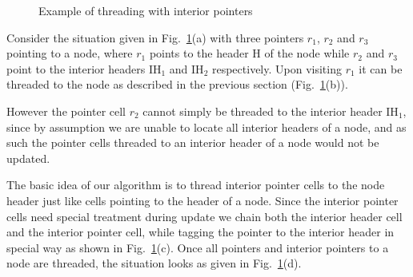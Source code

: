 \documentclass[10pt,a4paper,final,twocolumn]{article}
\begin{document}
\begin{figure}[htb]
  \caption{Example of threading with interior pointers}
  \label{fig:threadinginterior}
\end{figure}

Consider the situation given in Fig.~\ref{fig:threadinginterior}(a) with three pointers $r_1$, $r_2$ and
$r_3$ pointing to a node, where $r_1$ points to the header H of the node while $r_2$ and $r_3$ point to
the interior headers IH$_1$ and IH$_2$ respectively. Upon visiting $r_1$ it can be threaded to the node
as described in the previous section (Fig.~\ref{fig:threadinginterior}(b)).

However the pointer cell $r_2$ cannot simply be threaded to the interior header IH$_1$, since by
assumption we are unable to locate all interior headers of a node, and as such the pointer cells threaded
to an interior header of a node would not be updated.

The basic idea of our algorithm is to thread interior pointer cells to the node header just like
cells pointing to the header of a node. Since the interior pointer cells need special treatment
during update we chain both the interior header cell and the interior pointer cell, while tagging
the pointer to the interior header in special way as shown in Fig.~\ref{fig:threadinginterior}(c).
Once all pointers and interior pointers to a node are threaded, the situation looks as given in
Fig.~\ref{fig:threadinginterior}(d).
\end{document}
